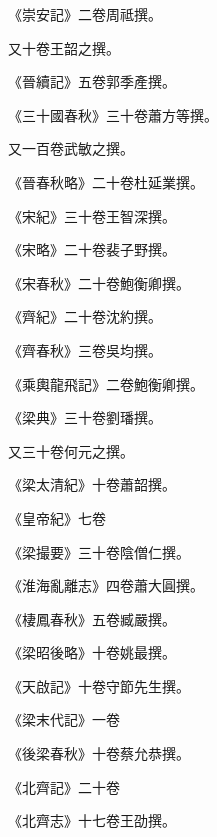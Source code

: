 \begin{pinyinscope}
 《崇安記》二卷周祗撰。



 又十卷王韶之撰。



 《晉續記》五卷郭季產撰。



 《三十國春秋》三十卷蕭方等撰。



 又一百卷武敏之撰。



 《晉春秋略》二十卷杜延業撰。



 《宋紀》三十卷王智深撰。



 《宋略》二十卷裴子野撰。



 《宋春秋》二十卷鮑衡卿撰。



 《齊紀》二十卷沈約撰。



 《齊春秋》三卷吳均撰。



 《乘輿龍飛記》二卷鮑衡卿撰。



 《梁典》三十卷劉璠撰。



 又三十卷何元之撰。



 《梁太清紀》十卷蕭韶撰。



 《皇帝紀》七卷



 《梁撮要》三十卷陰僧仁撰。



 《淮海亂離志》四卷蕭大圓撰。



 《棲鳳春秋》五卷臧嚴撰。



 《梁昭後略》十卷姚最撰。



 《天啟記》十卷守節先生撰。



 《梁末代記》一卷



 《後梁春秋》十卷蔡允恭撰。



 《北齊記》二十卷



 《北齊志》十七卷王劭撰。




\end{pinyinscope}
